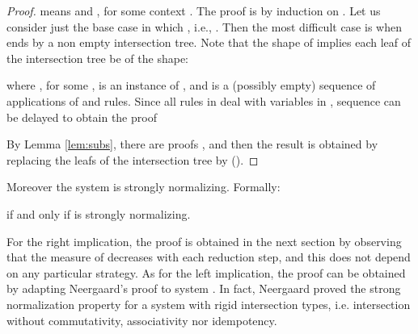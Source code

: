 \begin{proof}
 means  and , for some context . The proof is by induction on . 
Let us consider just the base case in which , i.e., . Then the most difficult case is when  ends by a non empty intersection tree. Note that the shape of  implies each leaf  of the intersection tree be of the shape:  
\small

\normalsize
where , for some ,  is an instance of , and  is a (possibly empty) sequence of applications of  and  rules.  Since all  rules in  deal with variables in , sequence  can be delayed to obtain the proof
\small

\normalsize
By Lemma \ref{lem:subs}, there are proofs , and then the result is obtained by replacing the leafs  of the intersection tree by
 (). 



\end{proof}





Moreover the system is strongly normalizing. Formally:

\begin{property}
\label{prop:sn}
 if and only if  is strongly normalizing.
\end{property}

For the right implication, the proof is obtained in the next section by observing that the measure of  decreases with each reduction step, and this does not depend on any particular strategy. As for the left implication, the proof can be obtained by adapting Neergaard's proof \cite{Neergaard05} to system \STI. In fact, Neergaard proved the strong normalization property for a system with rigid intersection types, i.e. intersection without commutativity, associativity nor idempotency.

